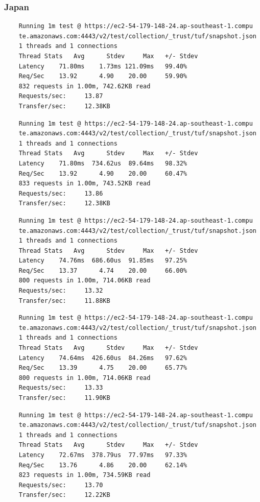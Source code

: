 \documentclass[a4paper,12pt]{article}
\newcounter{subsubsubsection}[subsubsection]
\begin{document}
{{\begin{verbatim}
	\end{verbatim}
	\newpage
	
	\subsubsection{Japan}
	\begin{verbatim}
	Running 1m test @ https://ec2-54-179-148-24.ap-southeast-1.compu
	te.amazonaws.com:4443/v2/test/collection/_trust/tuf/snapshot.json
	1 threads and 1 connections
	Thread Stats   Avg      Stdev     Max   +/- Stdev
	Latency    71.80ms    1.73ms 121.09ms   99.40%
	Req/Sec    13.92      4.90    20.00     59.90%
	832 requests in 1.00m, 742.62KB read
	Requests/sec:     13.87
	Transfer/sec:     12.38KB
	\end{verbatim}
	\begin{verbatim}
	Running 1m test @ https://ec2-54-179-148-24.ap-southeast-1.compu
	te.amazonaws.com:4443/v2/test/collection/_trust/tuf/snapshot.json
	1 threads and 1 connections
	Thread Stats   Avg      Stdev     Max   +/- Stdev
	Latency    71.80ms  734.62us  89.64ms   98.32%
	Req/Sec    13.92      4.90    20.00     60.47%
	833 requests in 1.00m, 743.52KB read
	Requests/sec:     13.86
	Transfer/sec:     12.38KB
	\end{verbatim}
	\begin{verbatim}
	Running 1m test @ https://ec2-54-179-148-24.ap-southeast-1.compu
	te.amazonaws.com:4443/v2/test/collection/_trust/tuf/snapshot.json
	1 threads and 1 connections
	Thread Stats   Avg      Stdev     Max   +/- Stdev
	Latency    74.76ms  686.60us  91.85ms   97.25%
	Req/Sec    13.37      4.74    20.00     66.00%
	800 requests in 1.00m, 714.06KB read
	Requests/sec:     13.32
	Transfer/sec:     11.88KB
	\end{verbatim}
	\begin{verbatim}
	Running 1m test @ https://ec2-54-179-148-24.ap-southeast-1.compu
	te.amazonaws.com:4443/v2/test/collection/_trust/tuf/snapshot.json
	1 threads and 1 connections
	Thread Stats   Avg      Stdev     Max   +/- Stdev
	Latency    74.64ms  426.60us  84.26ms   97.62%
	Req/Sec    13.39      4.75    20.00     65.77%
	800 requests in 1.00m, 714.06KB read
	Requests/sec:     13.33
	Transfer/sec:     11.90KB
	\end{verbatim}
	\newpage
	\begin{verbatim}
	Running 1m test @ https://ec2-54-179-148-24.ap-southeast-1.compu
	te.amazonaws.com:4443/v2/test/collection/_trust/tuf/snapshot.json
	1 threads and 1 connections
	Thread Stats   Avg      Stdev     Max   +/- Stdev
	Latency    72.67ms  378.79us  77.97ms   97.33%
	Req/Sec    13.76      4.86    20.00     62.14%
	823 requests in 1.00m, 734.59KB read
	Requests/sec:     13.70
	Transfer/sec:     12.22KB
	\end{verbatim}
	\newpage
	
}}
\end{document}
